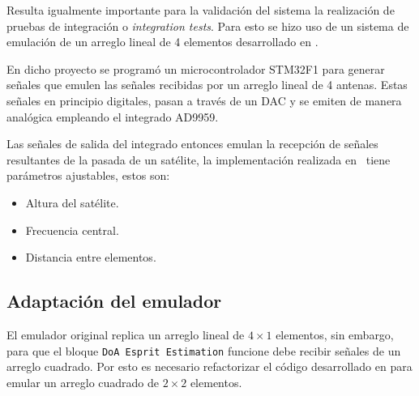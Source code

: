 \documentclass[../../main.tex]{subfiles}
\begin{document}
Resulta igualmente importante para la validación del sistema la realización de pruebas de integración o \textit{integration tests}. Para esto se hizo uso de un sistema de emulación de un arreglo lineal de 4 elementos desarrollado en \cite{proyecto-arce}.

En dicho proyecto se programó un microcontrolador STM32F1\cite{stm32f1} para generar señales que emulen las señales recibidas por un arreglo lineal de 4 antenas. Estas señales en principio digitales, pasan a través de un DAC y se emiten de manera analógica empleando el integrado AD9959\cite{ad9959}. 

Las señales de salida del integrado entonces emulan la recepción de señales resultantes de la pasada de un satélite, la implementación realizada en~\cite{proyecto-arce} tiene parámetros ajustables, estos son:
\begin{itemize}
    \item Altura del satélite.
    \item Frecuencia central.
    \item Distancia entre elementos.
\end{itemize}

\subsection{Adaptación del emulador}
El emulador original replica un arreglo lineal de $4 \times 1$ elementos, sin embargo, para que el bloque \texttt{DoA Esprit Estimation} funcione debe recibir señales de un arreglo cuadrado. Por esto es necesario refactorizar el código desarrollado en \cite{proyecto-arce} para emular un arreglo cuadrado de $2 \times 2$ elementos.
\end{document}

